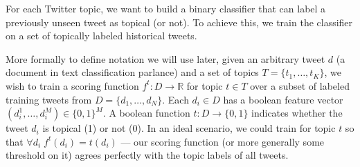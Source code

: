 For each Twitter topic, we want to build a binary classifier that can label
a previously unseen tweet as topical (or not).  To achieve this, we 
train the classifier on a set of topically labeled historical tweets.  

More formally to define notation we will use later, 
given an arbitrary tweet $d$ (a document in text classification parlance) 
and a set of topics $T = \{
t_1,\ldots,t_K\}$, we wish to train a scoring function $f^t: D \rightarrow \mathbb{R}$
for topic $t \in T$ over a subset of labeled training tweets from $D = \{
d_1,\ldots,d_N \}$.  Each $d_i \in D$ has a boolean feature vector 
$(d_i^1,\ldots,d_i^M) \in \{0,1\}^M$.  A boolean function $t : D \rightarrow \{
0,1 \}$ indicates whether the tweet $d_i$ is topical (1) or not
(0).  In an ideal scenario, we could train for topic $t$ 
so that $\forall d_i \; f^t(d_i) = t(d_i)$ --- our scoring
function (or more generally some threshold on it) agrees perfectly with the topic
labels of all tweets.  


%

